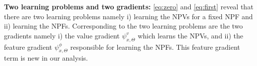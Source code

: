 \textbf{Two learning problems and two gradients:} \eqref{eq:zero} and \eqref{eq:first} reveal that there are two learning problems namely i) learning the NPVs for a fixed NPF and ii) learning the NPFs. Corresponding to the two learning problems are the two gradients namely i) the value gradient $\psi^v_{x,\Theta}$ which learns the NPVs, and ii) the feature gradient $\psi^{\phi}_{x,\Theta}$ responsible for learning the NPFs. This feature gradient term is new in our analysis.
\FloatBarrier
\begin{figure}[h]
\centering
\end{figure}
